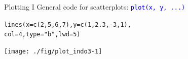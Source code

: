 \documentclass[xcolor=table,       handout,    xcolor=dvipsnames]{beamer}\usepackage[]{graphicx}\usepackage[]{color}
\makeatletter
\newcommand{\hlnum}[1]{\textcolor[rgb]{0,0,0}{#1}}
\newcommand{\hlstr}[1]{\textcolor[rgb]{0.545,0.137,0.137}{#1}}
\newcommand{\hlopt}[1]{\textcolor[rgb]{0,0,0}{#1}}
\newcommand{\hlstd}[1]{\textcolor[rgb]{0,0,0}{#1}}
\newcommand{\hlkwc}[1]{\textcolor[rgb]{1,0,1}{#1}}
\newcommand{\hlkwd}[1]{\textcolor[rgb]{0,0,1}{#1}}
\newenvironment{kframe}{%
 \def\at@end@of@kframe{}%
 \ifinner\ifhmode%
  \def\at@end@of@kframe{\end{minipage}}%
  \begin{minipage}{\columnwidth}%
 \fi\fi%
 \def\FrameCommand##1{\hskip\@totalleftmargin \hskip-\fboxsep
 \colorbox{shadecolor}{##1}\hskip-\fboxsep
     \hskip-\linewidth \hskip-\@totalleftmargin \hskip\columnwidth}%
 \MakeFramed {\advance\hsize-\width
   \@totalleftmargin\z@ \linewidth\hsize
   \@setminipage}}%
 {\par\unskip\endMakeFramed%
 \at@end@of@kframe}
\newenvironment{knitrout}{}{} %
\newcommand{\rcode}[1]{\texttt{\textcolor{Blue}{#1}}} %
\makeatother
\begin{document}
\begin{frame}[fragile]{Plotting I}
General code for scatterplots: \rcode{plot(x, y, ...)}
\begin{knitrout}
\color{fgcolor}\begin{kframe}
\begin{alltt}
\hlkwd{lines}\hlstd{(}\hlkwc{x}\hlstd{=}\hlkwd{c}\hlstd{(}\hlnum{2}\hlstd{,}\hlnum{5}\hlstd{,}\hlnum{6}\hlstd{,}\hlnum{7}\hlstd{),} \hlkwc{y}\hlstd{=}\hlkwd{c}\hlstd{(}\hlnum{1}\hlstd{,}\hlnum{2.3}\hlstd{,}\hlopt{-}\hlnum{3}\hlstd{,}\hlnum{1}\hlstd{),}
      \hlkwc{col}\hlstd{=}\hlnum{4}\hlstd{,} \hlkwc{type}\hlstd{=}\hlstr{"b"}\hlstd{,} \hlkwc{lwd}\hlstd{=}\hlnum{5}\hlstd{)}
\end{alltt}
\end{kframe}

{\centering \texttt{[image: ./fig/plot\_indo3-1]} 

}



\end{knitrout}
\end{frame}

\end{document}
